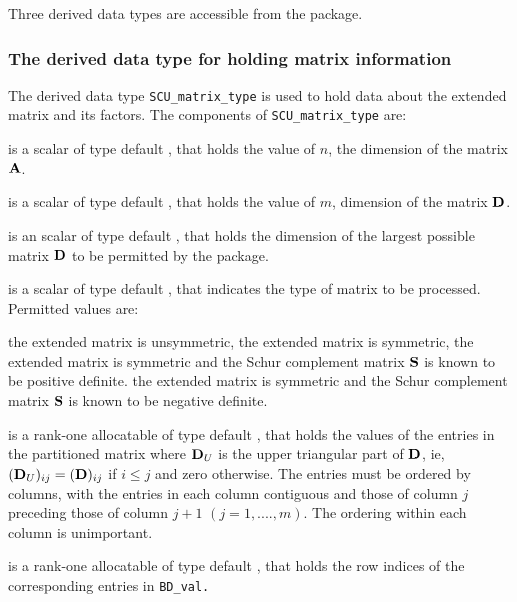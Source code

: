 \documentclass{galahad}
\newcommand{\packagename}{SCU}
\begin{document}

\galtypes
Three derived data types are accessible from the package.


\subsubsection{The derived data type for holding matrix information}
\label{typematrix}
The derived data type {\tt \packagename\_matrix\_type} is used to hold
data about the extended matrix and its factors. The components of
{\tt \packagename\_matrix\_type}
are:

\begin{description}

 is a scalar of type default \integer, that holds the value of
$n$, the dimension of the matrix $ {\mathbf{A}}$.

 is a scalar of type default \integer, that holds the value of
$m$, dimension of the matrix ${\mathbf{D}}$.

 is an scalar of type default \integer,
that holds the dimension of the largest possible matrix ${\mathbf{D}}$ to be permitted
by the package.

 is a scalar of type default \integer,
that indicates the type of matrix to be processed. Permitted values are:

\begin{description}
 the extended matrix is unsymmetric,
 the extended matrix is symmetric,
 the extended matrix is symmetric and the Schur complement matrix
${\mathbf{S}}$ is known to be positive definite.
 the extended matrix is symmetric and the Schur complement matrix
${\mathbf{S}}$ is known to be negative definite.
\end{description}

 is a rank-one allocatable of
type default \realdp,
that holds the values of the entries in the partitioned matrix
where ${\mathbf{D}}_U$ is the upper triangular part of ${\mathbf{D}}$, ie,
$( {\mathbf{D}}_U )_{ij}  =  ( {\mathbf{D}} )_{ij} $ if $i  \leq  j$ and zero otherwise.
The entries must be ordered by columns, with the entries in each column
contiguous and those of column
$j$ preceding those of column $j+1$ $(j = 1, ...., m)$. The ordering
within each column is unimportant.

 is a rank-one allocatable of type default \integer, that holds
the row indices of the corresponding entries in {\tt BD\_val.}


\end{description}
\end{document}
